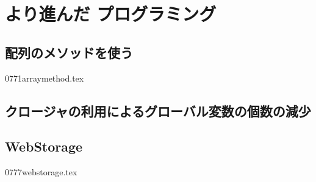 \section{より進んだ \JS プログラミング}
\subsection{配列のメソッドを使う}

 \CH 0771arraymethod.tex
\subsection{クロージャの利用によるグローバル変数の個数の減少}

\iffalse
	\subsection{オブジェクト指向\JS}
   \CH 0076objectorented.tex
\fi

\subsection{WebStorage}
\CH 0777webstorage.tex